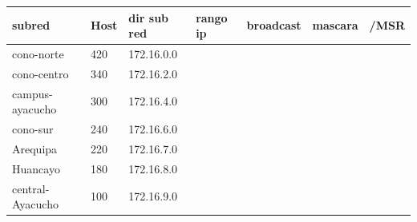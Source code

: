 \begin{landscape}
\begin{table}[htbp]
\begin{tabular}{|l|l|l|l|l|l|l|}
\hline
\rowcolor[HTML]{32CB00} 
\textbf{subred}  & Host & \textbf{dir sub red} & \textbf{rango ip} & \textbf{broadcast} & \textbf{mascara} & \textbf{/MSR} \\ \hline
cono-norte       & 420  & 172.16.0.0           &                   &                    &                  &               \\ \hline
cono-centro      & 340  & 172.16.2.0           &                   &                    &                  &               \\ \hline
campus-ayacucho  & 300  & 172.16.4.0           &                   &                    &                  &               \\ \hline
cono-sur         & 240  & 172.16.6.0           &                   &                    &                  &               \\ \hline
Arequipa         & 220  & 172.16.7.0           &                   &                    &                  &               \\ \hline
Huancayo         & 180  & 172.16.8.0           &                   &                    &                  &               \\ \hline
central-Ayacucho & 100  & 172.16.9.0           &                   &                    &                  &               \\ \hline
\end{tabular}
\end{table}




\end{landscape}
